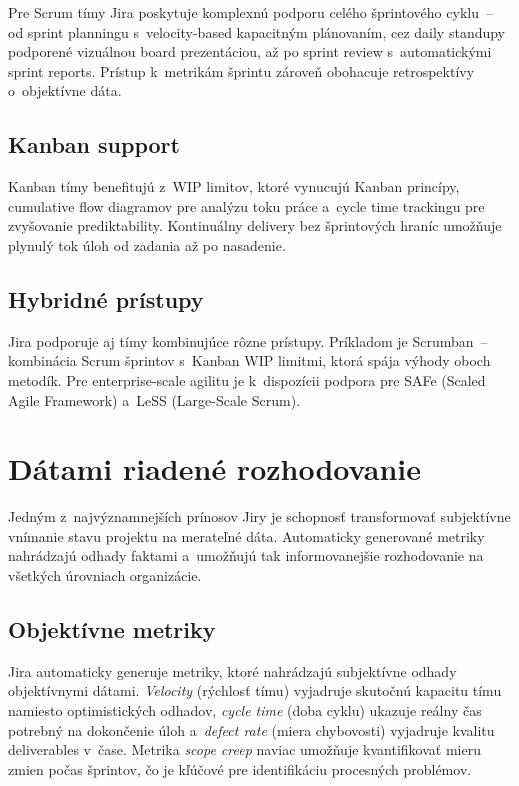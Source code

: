 Pre Scrum tímy Jira poskytuje komplexnú podporu celého šprintového cyklu~-- od sprint planningu s~velocity-based kapacitným plánovaním, cez daily standupy podporené vizuálnou board prezentáciou, až po sprint review s~automatickými sprint reports. Prístup k~metrikám šprintu zároveň obohacuje retrospektívy o~objektívne dáta.

\subsection{Kanban support}

Kanban tímy benefitujú z~WIP limitov, ktoré vynucujú Kanban princípy, cumulative flow diagramov pre analýzu toku práce a~cycle time trackingu pre zvyšovanie prediktability. Kontinuálny delivery bez šprintových hraníc umožňuje plynulý tok úloh od zadania až po nasadenie.

\subsection{Hybridné prístupy}

Jira podporuje aj tímy kombinujúce rôzne prístupy. Príkladom je Scrumban~-- kombinácia Scrum šprintov s~Kanban WIP limitmi, ktorá spája výhody oboch metodík. Pre enterprise-scale agilitu je k~dispozícii podpora pre SAFe (Scaled Agile Framework) \cite{safe2024} a~LeSS (Large-Scale Scrum).

\section{Dátami riadené rozhodovanie}

Jedným z~najvýznamnejších prínosov Jiry je schopnosť transformovať subjektívne vnímanie stavu projektu na merateľné dáta. Automaticky generované metriky nahrádzajú odhady faktami a~umožňujú tak informovanejšie rozhodovanie na všetkých úrovniach organizácie.

\subsection{Objektívne metriky}

Jira automaticky generuje metriky, ktoré nahrádzajú subjektívne odhady objektívnymi dátami. \textit{Velocity} (rýchlosť tímu) vyjadruje skutočnú kapacitu tímu namiesto optimistických odhadov, \textit{cycle time} (doba cyklu) ukazuje reálny čas potrebný na dokončenie úloh a~\textit{defect rate} (miera chybovosti) vyjadruje kvalitu deliverables v~čase. Metrika \textit{scope creep} naviac umožňuje kvantifikovať mieru zmien počas šprintov, čo je kľúčové pre identifikáciu procesných problémov.

